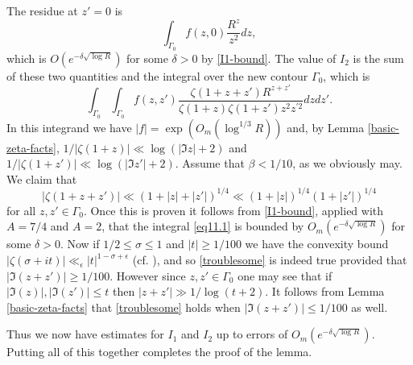 \documentclass[12pt,a4paper,reqno]{amsart}
\numberwithin{equation}{section}
\theoremstyle{plain}
\theoremstyle{definition}
\renewcommand{\leq}{\leqslant}
\renewcommand{\geq}{\geqslant}
\def\vs{\vspace{11pt}}
\def\ni{\noindent}
\def\endproof{\hfill{\usebox{\proofbox}}}
\begin{document}
\ni The residue at $z' = 0$ is
\[ \int_{\Gamma_0} f(z,0) \frac{R^{z}}{z^2} dz,\] which is $O(e^{-\delta \sqrt{\log R}})$ for some $\delta > 0$ by \eqref{I1-bound}. The value of $I_2$ is the sum of these two quantities and the integral over the new contour $\Gamma_0$, which is 
\begin{equation}\label{eq11.1} \int_{\Gamma_0}\int_{\Gamma_0} f(z,z') \frac{\zeta(1 + z + z') R^{z + z'}}{\zeta(1 + z)\zeta(1 + z') z^2 z^{\prime 2}}dz dz'.\end{equation}
In this integrand we have $|f| = \exp(O_m(\log^{1/3} R))$ and, by Lemma \ref{basic-zeta-facts}, $1/|\zeta(1 + z)| \ll \log (|\Im z| + 2)$ and $1/|\zeta(1 + z')| \ll \log (|\Im z'| + 2)$. Assume that $\beta < 1/10$, as we obviously may. We claim that
\begin{equation}\label{troublesome} |\zeta(1 + z + z')| \ll  (1 + |z| + |z'|)^{1/4} \ll (1 + |z|)^{1/4}(1 + |z'|)^{1/4}\end{equation}
for all $z,z' \in \Gamma_0$. Once this is proven it follows from \eqref{I1-bound}, applied with $A = 7/4$ and $A = 2$, that the integral \eqref{eq11.1} is bounded by $O_m(e^{-\delta\sqrt{\log R}})$ for some $\delta > 0$. Now if $1/2 \leq \sigma \leq 1$ and $|t| \geq 1/100$ we have the convexity bound $|\zeta(\sigma + it)| \ll_{\epsilon} |t|^{1 - \sigma + \epsilon}$ (cf. \cite[Chapter V]{titchmarsh}), and so \eqref{troublesome} is indeed true provided that $|\Im(z + z')| \geq 1/100$. However since $z,z' \in \Gamma_0$ one may see that if $|\Im(z)|,|\Im(z')| \leq t$ then $|z + z'| \gg 1/\log(t + 2)$. It follows from Lemma \ref{basic-zeta-facts} that \eqref{troublesome} holds when $|\Im(z + z')| \leq 1/100$ as well.\vs

\ni Thus we now have estimates for $I_1$ and $I_2$ up to errors of $O_m(e^{-\delta\sqrt{\log R}})$. Putting all of this together completes the proof of the lemma.\endproof\vspace{11pt}
\end{document}
